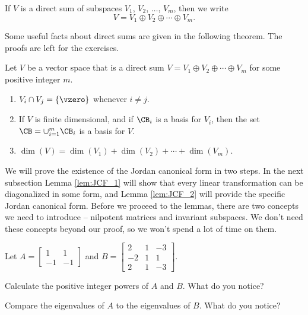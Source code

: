 If $V$ is a direct sum of subspaces $V_1$, $V_2$, $\ldots$, $V_m$, then we write
\[V = V_1 \oplus V_2 \oplus \cdots \oplus V_m.\]

Some useful facts about direct sums are given in the following theorem. The proofs are left for the exercises.

\begin{theorem} \label{thm:Direct_sum_properties} Let $V$ be a vector space that is a direct sum $V = V_1 \oplus V_2 \oplus \cdots \oplus V_m$ for some positive integer $m$. 
\begin{enumerate}
\item $V_i \cap V_j = \{\vzero\}$ whenever $i \neq j$.
\item If $V$ is finite dimensional, and if $\CB_i$ is a basis for $V_i$, then the set $\CB = \cup_{i=1}^m \CB_i$ is a basis for $V$. 
\item $\dim(V) = \dim(V_1) + \dim(V_2) + \cdots + \dim(V_m)$.
\end{enumerate}
\end{theorem}


\label{sec:mtx_nilpotent}

We will prove the existence of the Jordan canonical form in two steps. In the next subsection Lemma \ref{lem:JCF_1} will show that every linear transformation can be diagonalized in some form, and Lemma \ref{lem:JCF_2} will provide the specific Jordan canonical form. Before we proceed to the lemmas, there are two concepts we need to introduce -- nilpotent matrices and invariant subspaces. We don't need these concepts beyond our proof, so we won't spend a lot of time on them.
 
\begin{activity} \label{act:nilpotent_intro} Let $A = \left[ \begin{array}{rr} 1&1\\-1&-1 \end{array} \right]$ and $B = \left[ \begin{array}{rcr} 2&1&-3 \\ -2&1&1 \\ 2&1&-3 \end{array} \right]$.  
\ba
\item Calculate the positive integer powers of $A$ and $B$. What do you notice?

\item Compare the eigenvalues of $A$ to the eigenvalues of $B$. What do you notice?

\ea
\end{activity}

